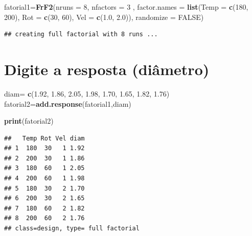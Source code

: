 \documentclass[
]{article}
\newenvironment{Shaded}{\begin{snugshade}}{\end{snugshade}}
\newcommand{\AttributeTok}[1]{\textcolor[rgb]{0.13,0.29,0.53}{#1}}
\newcommand{\ConstantTok}[1]{\textcolor[rgb]{0.56,0.35,0.01}{#1}}
\newcommand{\DecValTok}[1]{\textcolor[rgb]{0.00,0.00,0.81}{#1}}
\newcommand{\FloatTok}[1]{\textcolor[rgb]{0.00,0.00,0.81}{#1}}
\newcommand{\FunctionTok}[1]{\textcolor[rgb]{0.13,0.29,0.53}{\textbf{#1}}}
\newcommand{\NormalTok}[1]{#1}
\newcommand{\OtherTok}[1]{\textcolor[rgb]{0.56,0.35,0.01}{#1}}
\begin{document}
\begin{Shaded}
\begin{Highlighting}[]
\NormalTok{fatorial1}\OtherTok{=}\FunctionTok{FrF2}\NormalTok{(}\AttributeTok{nruns =} \DecValTok{8}\NormalTok{, }\AttributeTok{nfactors =} \DecValTok{3}\NormalTok{ , }\AttributeTok{factor.names =} \FunctionTok{list}\NormalTok{(}\AttributeTok{Temp =} \FunctionTok{c}\NormalTok{(}\DecValTok{180}\NormalTok{, }\DecValTok{200}\NormalTok{), }\AttributeTok{Rot =} \FunctionTok{c}\NormalTok{(}\DecValTok{30}\NormalTok{, }\DecValTok{60}\NormalTok{), }\AttributeTok{Vel =} \FunctionTok{c}\NormalTok{(}\FloatTok{1.0}\NormalTok{, }\FloatTok{2.0}\NormalTok{)),}
                 \AttributeTok{randomize =} \ConstantTok{FALSE}\NormalTok{)}
\end{Highlighting}
\end{Shaded}

\begin{verbatim}
## creating full factorial with 8 runs ...
\end{verbatim}

\section{Digite a resposta
(diâmetro)}\label{digite-a-resposta-diuxe2metro}

\begin{Shaded}
\begin{Highlighting}[]
\NormalTok{diam}\OtherTok{=} \FunctionTok{c}\NormalTok{(}\FloatTok{1.92}\NormalTok{, }\FloatTok{1.86}\NormalTok{, }\FloatTok{2.05}\NormalTok{, }\FloatTok{1.98}\NormalTok{, }\FloatTok{1.70}\NormalTok{, }\FloatTok{1.65}\NormalTok{, }\FloatTok{1.82}\NormalTok{, }\FloatTok{1.76}\NormalTok{)}
\NormalTok{fatorial2}\OtherTok{=}\FunctionTok{add.response}\NormalTok{(fatorial1,diam)}
\end{Highlighting}
\end{Shaded}

\begin{Shaded}
\begin{Highlighting}[]
\FunctionTok{print}\NormalTok{(fatorial2)}
\end{Highlighting}
\end{Shaded}

\begin{verbatim}
##   Temp Rot Vel diam
## 1  180  30   1 1.92
## 2  200  30   1 1.86
## 3  180  60   1 2.05
## 4  200  60   1 1.98
## 5  180  30   2 1.70
## 6  200  30   2 1.65
## 7  180  60   2 1.82
## 8  200  60   2 1.76
## class=design, type= full factorial
\end{verbatim}
\end{document}
